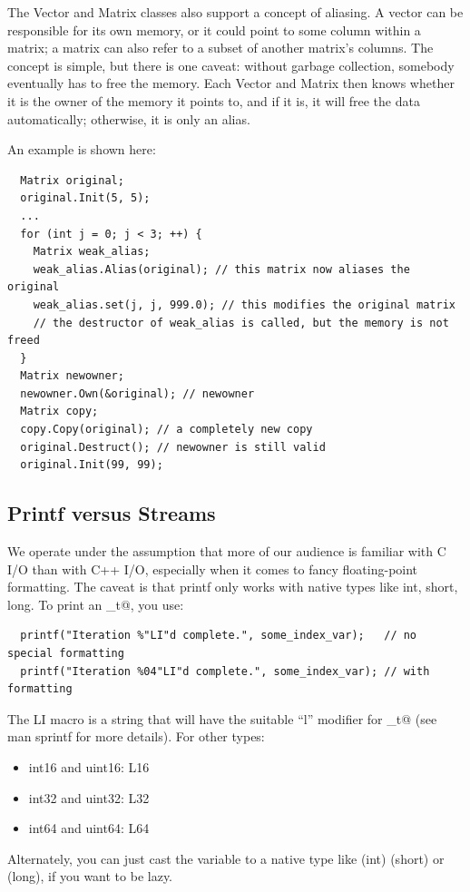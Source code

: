\documentclass[letter]{report}
\begin{document}
The Vector and Matrix classes also support a concept of aliasing. A vector can be responsible for its own memory, or it could point to some column within a matrix; a matrix can also refer to a subset of another matrix's columns. The concept is simple, but there is one caveat: without garbage collection, somebody eventually has to free the memory. Each Vector and Matrix then knows whether it is the owner of the memory it points to, and if it is, it will free the data automatically; otherwise, it is only an alias.

An example is shown here:
\begin{verbatim}
  Matrix original;
  original.Init(5, 5);
  ...
  for (int j = 0; j < 3; ++) {
    Matrix weak_alias;
    weak_alias.Alias(original); // this matrix now aliases the original
    weak_alias.set(j, j, 999.0); // this modifies the original matrix
    // the destructor of weak_alias is called, but the memory is not freed
  }
  Matrix newowner;
  newowner.Own(&original); // newowner
  Matrix copy;
  copy.Copy(original); // a completely new copy 
  original.Destruct(); // newowner is still valid
  original.Init(99, 99);
\end{verbatim}

\subsection{Printf versus Streams}

We operate under the assumption that more of our audience is familiar with C I/O than with C++ I/O, especially when it comes to fancy floating-point formatting. The caveat is that printf only works with native types like int, short, long. To print an \verb@index_t@, you use:
\begin{verbatim}
  printf("Iteration %"LI"d complete.", some_index_var);   // no special formatting
  printf("Iteration %04"LI"d complete.", some_index_var); // with formatting
\end{verbatim}
The LI macro is a string that will have the suitable ``l'' modifier for \verb@index_t@ (see man sprintf for more details). For other types:
\begin {itemize}
\item int16 and uint16: L16
\item int32 and uint32: L32
\item int64 and uint64: L64 
\end{itemize}
Alternately, you can just cast the variable to a native type like (int) (short) or (long), if you want to be lazy.
\end{document}
